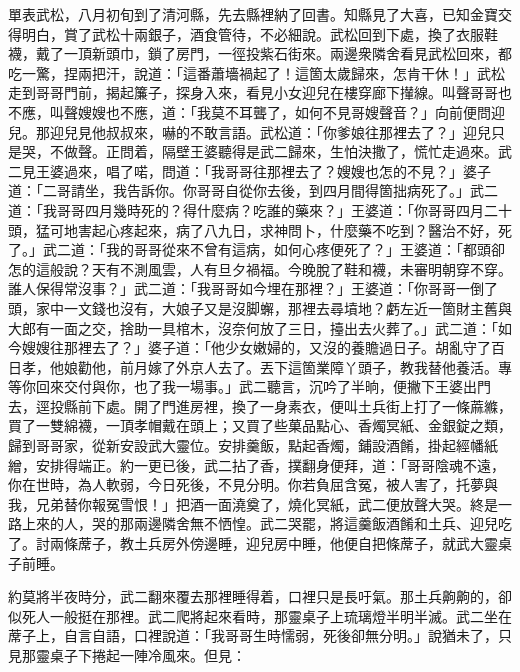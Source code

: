 單表武松，八月初旬到了清河縣，先去縣裡納了回書。知縣見了大喜，已知金寶交得明白，賞了武松十兩銀子，酒食管待，不必細說。武松回到下處，換了衣服鞋襪，戴了一頂新頭巾，鎖了房門，一徑投紫石街來。兩邊衆隣舍看見武松回來，都吃一驚，捏兩把汗，說道：「這番蕭墻禍起了！這箇太歲歸來，怎肯干休！」武松走到哥哥門前，揭起簾子，探身入來，看見小女迎兒在樓穿廊下攆線。叫聲哥哥也不應，叫聲嫂嫂也不應，道：「我莫不耳聾了，如何不見哥嫂聲音？」向前便問迎兒。那迎兒見他叔叔來，嚇的不敢言語。武松道：「你爹娘往那裡去了？」迎兒只是哭，不做聲。{}正問着，隔壁王婆聽得是武二歸來，生怕決撒了，慌忙走過來。武二見王婆過來，唱了喏，問道：「我哥哥往那裡去了？嫂嫂也怎的不見？」婆子道：「二哥請坐，我告訴你。你哥哥自從你去後，到四月間得箇拙病死了。」武二道：「我哥哥四月幾時死的？得什麼病？吃誰的藥來？」王婆道：「你哥哥四月二十頭，猛可地害起心疼起來，病了八九日，求神問卜，什麼藥不吃到？{}醫治不好，死了。」武二道：「我的哥哥從來不曾有這病，如何心疼便死了？」王婆道：「都頭卻怎的這般說？天有不測風雲，人有旦夕禍福。今晚脫了鞋和襪，未審明朝穿不穿。誰人保得常沒事？」{}武二道：「我哥哥如今埋在那裡？」王婆道：「你哥哥一倒了頭，家中一文錢也沒有，大娘子又是沒脚蠏，那裡去尋墳地？虧左近一箇財主舊與大郎有一面之交，捨助一具棺木，沒奈何放了三日，擡出去火葬了。」武二道：「如今嫂嫂往那裡去了？」婆子道：「他少女嫩婦的，又沒的養贍過日子。胡亂守了百日孝，他娘勸他，前月嫁了外京人去了。丟下這箇業障丫頭子，教我替他養活。{}專等你回來交付與你，也了我一場事。」武二聽言，沉吟了半晌，{}便撇下王婆出門去，逕投縣前下處。開了門進房裡，換了一身素衣，便叫土兵街上打了一條蔴縧，買了一雙綿襪，一頂孝帽戴在頭上；又買了些菓品點心、香燭冥紙、金銀錠之類，歸到哥哥家，從新安設武大靈位。安排羹飯，點起香燭，鋪設酒餚，掛起經幡紙繒，安排得端正。{}約一更已後，武二拈了香，撲翻身便拜，道：「哥哥陰魂不遠，你在世時，為人軟弱，今日死後，不見分明。你若負屈含冤，被人害了，托夢與我，兄弟替你報冤雪恨！」把酒一面澆奠了，燒化冥紙，武二便放聲大哭。{}終是一路上來的人，哭的那兩邊隣舍無不恓惶。武二哭罷，將這羹飯酒餚和土兵、迎兒吃了。討兩條蓆子，教土兵房外傍邊睡，迎兒房中睡，他便自把條蓆子，就武大靈桌子前睡。

約莫將半夜時分，武二翻來覆去那裡睡得着，口裡只是長吁氣。那土兵齁齁的，卻似死人一般挺在那裡。武二爬將起來看時，那靈桌子上琉璃燈半明半滅。武二坐在蓆子上，自言自語，口裡說道：「我哥哥生時懦弱，死後卻無分明。」說猶未了，只見那靈桌子下捲起一陣冷風來。但見：


